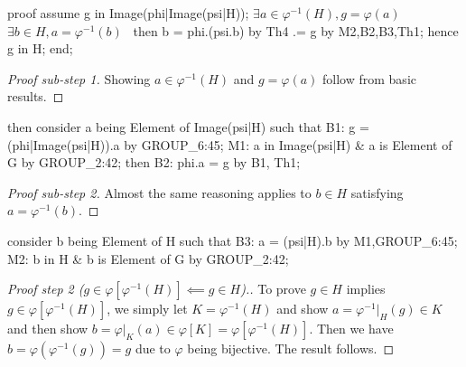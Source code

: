 \nwenddocs{}\endmoddef\nwstartdeflinemarkup{}\nwenddeflinemarkup
proof
  assume g in Image(phi|Image(psi|H));
  \LA{}$\exists a\in\varphi^{-1}(H),g=\varphi(a)$~{\nwtagstyle{}}\RA{}
  \LA{}$\exists b\in H, a = \varphi^{-1}(b)$~{\nwtagstyle{}}\RA{}
  then b = phi.(psi.b) by Th4
        .= g by M2,B2,B3,Th1;
  hence g in H;
end;
\nwendcode{}\nwdocspar

\begin{proof}[Proof sub-step 1]
Showing $a\in\varphi^{-1}(H)$ and $g=\varphi(a)$ follow from basic results.
\end{proof}

\nwenddocs{}\endmoddef\nwstartdeflinemarkup{}\nwenddeflinemarkup
then consider a being Element of Image(psi|H) such that
B1: g = (phi|Image(psi|H)).a by GROUP_6:45;
M1: a in Image(psi|H) & a is Element of G by GROUP_2:42;
then B2: phi.a = g by B1, Th1;
\nwendcode{}\nwdocspar

\begin{proof}[Proof sub-step 2]
Almost the same reasoning applies to $b\in H$ satisfying
$a=\varphi^{-1}(b)$.
\end{proof}

\nwenddocs{}\endmoddef\nwstartdeflinemarkup{}\nwenddeflinemarkup
consider b being Element of H such that
B3: a = (psi|H).b
by M1,GROUP_6:45;
M2: b in H & b is Element of G by GROUP_2:42;
\nwendcode{}\nwdocspar

\begin{proof}[{Proof step 2 ($g\in\varphi[\varphi^{-1}(H)]\impliedby g\in H$)}.]
To prove $g\in H$ implies $g\in\varphi[\varphi^{-1}(H)]$, we simply
let $K=\varphi^{-1}(H)$ and show $a = \varphi^{-1}|_{H}(g)\in K$ and
then show $b=\varphi|_{K}(a)\in\varphi[K]=\varphi[\varphi^{-1}(H)]$. Then
we have $b=\varphi(\varphi^{-1}(g))=g$ due to $\varphi$ being bijective.
The result follows.
\end{proof}

